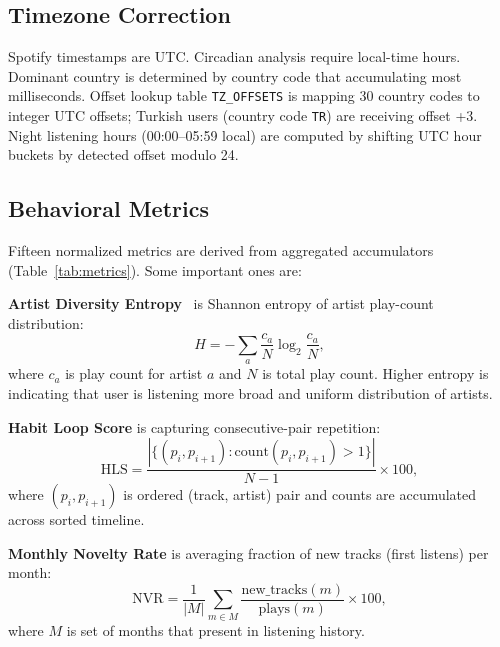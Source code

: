\documentclass[conference]{IEEEtran}
\begin{document}
\subsection{Timezone Correction}

Spotify timestamps are UTC. Circadian analysis require local-time hours. Dominant country is determined by country code that accumulating most milliseconds. Offset lookup table \texttt{TZ\_OFFSETS} is mapping 30 country codes to integer UTC offsets; Turkish users (country code \texttt{TR}) are receiving offset +3. Night listening hours (00:00--05:59 local) are computed by shifting UTC hour buckets by detected offset modulo 24.

\subsection{Behavioral Metrics}

Fifteen normalized metrics are derived from aggregated accumulators (Table~\ref{tab:metrics}). Some important ones are:

\textbf{Artist Diversity Entropy}~\cite{shannon1948mathematical} is Shannon entropy of artist play-count distribution:
\begin{equation}
  H = -\sum_{a} \frac{c_a}{N} \log_2 \frac{c_a}{N},
\end{equation}
where $c_a$ is play count for artist $a$ and $N$ is total play count. Higher entropy is indicating that user is listening more broad and uniform distribution of artists.

\textbf{Habit Loop Score} is capturing consecutive-pair repetition:
\begin{equation}
  \text{HLS} = \frac{|\{(p_i, p_{i+1}) : \mathrm{count}(p_i, p_{i+1}) > 1\}|}{N - 1} \times 100,
\end{equation}
where $(p_i, p_{i+1})$ is ordered (track, artist) pair and counts are accumulated across sorted timeline.

\textbf{Monthly Novelty Rate} is averaging fraction of new tracks (first listens) per month:
\begin{equation}
  \text{NVR} = \frac{1}{|M|} \sum_{m \in M} \frac{\text{new\_tracks}(m)}{\text{plays}(m)} \times 100,
\end{equation}
where $M$ is set of months that present in listening history.
\end{document}
